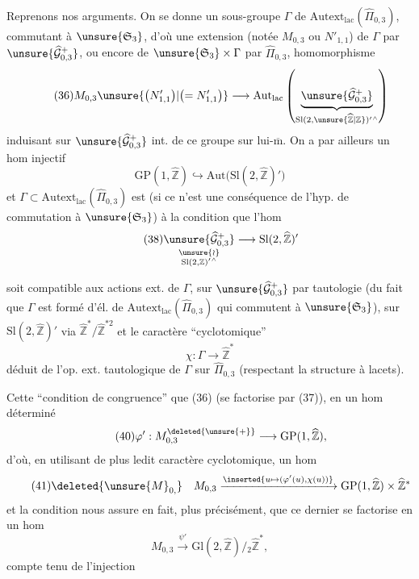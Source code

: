 Reprenons nos arguments. On se donne un sous-groupe $\Gamma$ de
$\mathrm{Autext}_{\mathrm{lac}}(\widehat{\Pi}_{0,3})$, commutant à
$\unsure{\mathfrak S_3}$, d'où une extension 
(notée $M_{0,3}$ ou $N'_{1,1}$) de $\Gamma$ par
$\unsure{\widehat{\mathcal G}_{0,3}^{+}}$, ou encore de
$\unsure{\mathfrak S_3}\times\Gamma$ par $\widehat{\Pi}_{0,3}$,
 homomorphisme
\[
\tag{36}
M_{0,3}\unsure{\bigl(N'_{1,1}\bigr)|\bigl(=N'_{1,1}\bigr)}\longrightarrow
\mathrm{Aut}_{\mathrm{lac}}\left(
\underbrace{\unsure{\widehat{\mathcal G}_{0,3}^{+}}}_{\mathrm{Sl}(2,\unsure{\widehat{\mathbb Z}|\mathbb Z})'{}^{\wedge}}
\right)
\]
induisant sur $\unsure{\widehat{\mathcal G}_{0,3}^{+}}$
int. de ce groupe sur lui-$\overline{\mathrm m}$.
On a par ailleurs un hom injectif
\[
\tag{37}
\mathrm{GP}(1,\widehat{\mathbb Z})\hookrightarrow
\mathrm{Aut}\bigl(\mathrm{Sl}(2,\widehat{\mathbb Z})'\bigr)
\]
et $\Gamma\subset\mathrm{Autext}_{\mathrm{lac}}(\widehat{\Pi}_{0,3})$ est
 (si ce n'est  une conséquence de l'hyp. de commutation à
$\unsure{\mathfrak S_3}$) à la condition que l'hom
\[
\tag{38}
\underset{\substack{\unsure{\wr}\\\mathrm{Sl}(2,\mathbb Z)'{}^{\wedge}}}{\unsure{\widehat{\mathcal G}_{0,3}^{+}}}
\longrightarrow\mathrm{Sl}(2,\widehat{\mathbb Z})'
\]



soit compatible aux actions ext. de $\Gamma$, sur
$\unsure{\widehat{\mathcal G}_{0,3}^{+}}$ par tautologie (du fait que $\Gamma$ est formé
d'él. de $\mathrm{Autext}_{\mathrm{lac}}(\widehat{\Pi}_{0,3})$ qui commutent à
$\unsure{\mathfrak S_3}$), sur $\mathrm{Sl}(2,\widehat{\mathbb Z})'$ via
$\widehat{\mathbb Z}^{*}/\widehat{\mathbb Z}^{*2}$ et le caractère ``cyclotomique''
\[
\tag{39}
\chi:\Gamma\longrightarrow\widehat{\mathbb Z}^{*}
\]
déduit de l'op. ext. tautologique de $\Gamma$ sur $\widehat{\Pi}_{0,3}$
(respectant la structure à lacets).

Cette ``condition de congruence'' 
  que (36)
(se factorise par (37)), en un hom  déterminé
\[
\tag{40}
\varphi':M_{0,3}^{\deleted{\unsure{+}}}\longrightarrow\mathrm{GP}(1,\widehat{\mathbb Z}),
\]
d'où, en utilisant de plus ledit caractère cyclotomique, un hom
\[
\tag{41}
\deleted{\unsure{M}_{0,}}\quad M_{0,3}
\xrightarrow{\inserted{u\mapsto(\varphi'(u),\chi(u))}}
\mathrm{GP}(1,\widehat{\mathbb Z})\times\widehat{\mathbb Z}^{*}
\]
et la condition  nous assure en fait, plus précisément, que ce dernier
se factorise en un hom
\[
\tag{42}
M_{0,3}\xrightarrow{\psi'}\mathrm{Gl}(2,\widehat{\mathbb Z})/{}_{2}\widehat{\mathbb Z}^{*},
\]
compte tenu de l'injection

